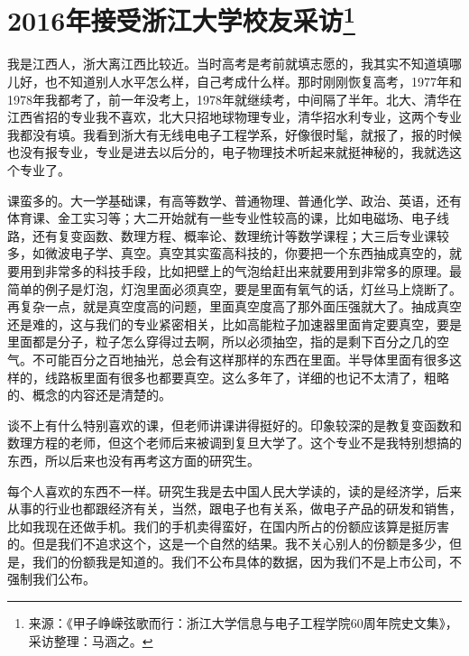 
\section[2016年接受浙江大学校友采访]{2016年接受浙江大学校友采访\footnote{来源：《甲子峥嵘弦歌而行：浙江大学信息与电子工程学院60周年院史文集》，采访整理：马涵之。}}


我是江西人，浙大离江西比较近。当时高考是考前就填志愿的，我其实不知道填哪儿好，也不知道别人水平怎么样，自己考成什么样。那时刚刚恢复高考，1977年和1978年我都考了，前一年没考上，1978年就继续考，中间隔了半年。北大、清华在江西省招的专业我不喜欢，北大只招地球物理专业，清华招水利专业，这两个专业我都没有填。我看到浙大有无线电电子工程学系，好像很时髦，就报了，报的时候也没有报专业，专业是进去以后分的，电子物理技术听起来就挺神秘的，我就选这个专业了。


课蛮多的。大一学基础课，有高等数学、普通物理、普通化学、政治、英语，还有体育课、金工实习等；大二开始就有一些专业性较高的课，比如电磁场、电子线路，还有复变函数、数理方程、概率论、数理统计等数学课程；大三后专业课较多，如微波电子学、真空。真空其实蛮高科技的，你要把一个东西抽成真空的，就要用到非常多的科技手段，比如把壁上的气泡给赶出来就要用到非常多的原理。最简单的例子是灯泡，灯泡里面必须真空，要是里面有氧气的话，灯丝马上烧断了。再复杂一点，就是真空度高的问题，里面真空度高了那外面压强就大了。抽成真空还是难的，这与我们的专业紧密相关，比如高能粒子加速器里面肯定要真空，要是里面都是分子，粒子怎么穿得过去啊，所以必须抽空，指的是剩下百分之几的空气。不可能百分之百地抽光，总会有这样那样的东西在里面。半导体里面有很多这样的，线路板里面有很多也都要真空。这么多年了，详细的也记不太清了，粗略的、概念的内容还是清楚的。

谈不上有什么特别喜欢的课，但老师讲课讲得挺好的。印象较深的是教复变函数和数理方程的老师，但这个老师后来被调到复旦大学了。这个专业不是我特别想搞的东西，所以后来也没有再考这方面的研究生。

每个人喜欢的东西不一样。研究生我是去中国人民大学读的，读的是经济学，后来从事的行业也都跟经济有关，当然，跟电子也有关系，做电子产品的研发和销售，比如我现在还做手机。我们的手机卖得蛮好，在国内所占的份额应该算是挺厉害的。但是我们不追求这个，这是一个自然的结果。我不关心别人的份额是多少，但是，我们的份额我是知道的。我们不公布具体的数据，因为我们不是上市公司，不强制我们公布。


